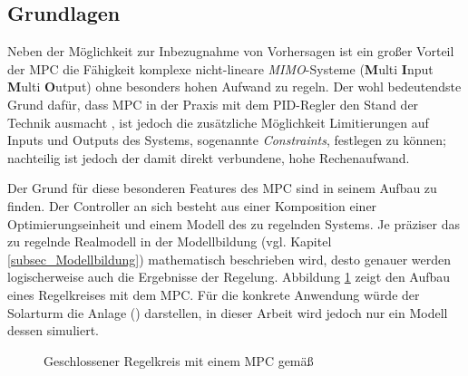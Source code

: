 \subsection{Grundlagen} \label{subsec_GrundlagenMPC}
Neben der Möglichkeit zur Inbezugnahme von Vorhersagen ist ein großer Vorteil der MPC die Fähigkeit komplexe nicht-lineare \textit{MIMO}-Systeme (\textbf{M}ulti \textbf{I}nput \textbf{M}ulti \textbf{O}utput) ohne besonders hohen Aufwand zu regeln.
Der wohl bedeutendste Grund dafür, dass MPC in der Praxis mit dem PID-Regler den Stand der Technik ausmacht \cite[S.viii]{Kouvaritakis}, ist jedoch die zusätzliche Möglichkeit Limitierungen auf Inputs und Outputs des Systems, sogenannte \textit{Constraints}, festlegen zu können; nachteilig ist jedoch der damit direkt verbundene, hohe Rechenaufwand. \cite[S.1-2]{Kouvaritakis}

Der Grund für diese besonderen Features des MPC sind in seinem Aufbau zu finden.
Der Controller an sich besteht aus einer Komposition einer Optimierungseinheit und einem Modell des zu regelnden Systems.
Je präziser das zu regelnde Realmodell in der Modellbildung (vgl. Kapitel \ref{subsec_Modellbildung}) mathematisch beschrieben wird, desto genauer werden logischerweise auch die Ergebnisse der Regelung.
Abbildung \ref{fig_RegelkreisMPC} zeigt den Aufbau eines Regelkreises mit dem MPC.
Für die konkrete Anwendung würde der Solarturm die Anlage () darstellen, in dieser Arbeit wird jedoch nur ein Modell dessen simuliert.

\begin{figure}[h!]
    \centering
    \setlength{\fboxsep}{1pt}
    \setlength{\fboxrule}{1pt}
\caption[Geschlossener Regelkreis mit einem MPC]{Geschlossener Regelkreis mit einem MPC gemäß\cite[S.2]{Schwenzer}}
    \label{fig_RegelkreisMPC}
\end{figure}

